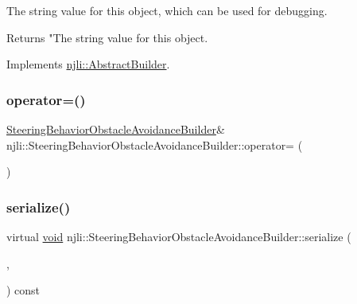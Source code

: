 The string value for this object, which can be used for debugging.

\begin{DoxyReturn}{Returns}
"The string value for this object. 
\end{DoxyReturn}


Implements \mbox{\hyperlink{classnjli_1_1_abstract_builder_a3e6e553e06d1ca30517ad5fb0bd4d000}{njli\+::\+Abstract\+Builder}}.

\mbox{\label{classnjli_1_1_steering_behavior_obstacle_avoidance_builder_ac74b5307c5c048bc54d1bbba15e8b055}} 
\subsubsection{\texorpdfstring{operator=()}{operator=()}}
{\footnotesize\ttfamily \mbox{\hyperlink{classnjli_1_1_steering_behavior_obstacle_avoidance_builder}{Steering\+Behavior\+Obstacle\+Avoidance\+Builder}}\& njli\+::\+Steering\+Behavior\+Obstacle\+Avoidance\+Builder\+::operator= (\begin{DoxyParamCaption}\item[{const \mbox{\hyperlink{classnjli_1_1_steering_behavior_obstacle_avoidance_builder}{Steering\+Behavior\+Obstacle\+Avoidance\+Builder}} \&}]{ }\end{DoxyParamCaption})\hspace{0.3cm}{\ttfamily [protected]}}

\mbox{\label{classnjli_1_1_steering_behavior_obstacle_avoidance_builder_a13ef8e5066f276bb2ef1d14cf85234f7}} 
\subsubsection{\texorpdfstring{serialize()}{serialize()}}
{\footnotesize\ttfamily virtual \mbox{\hyperlink{_thread_8h_af1e856da2e658414cb2456cb6f7ebc66}{void}} njli\+::\+Steering\+Behavior\+Obstacle\+Avoidance\+Builder\+::serialize (\begin{DoxyParamCaption}\item[{\mbox{\hyperlink{_thread_8h_af1e856da2e658414cb2456cb6f7ebc66}{void}} $\ast$}]{,  }\item[{bt\+Serializer $\ast$}]{ }\end{DoxyParamCaption}) const\hspace{0.3cm}{\ttfamily [virtual]}}


